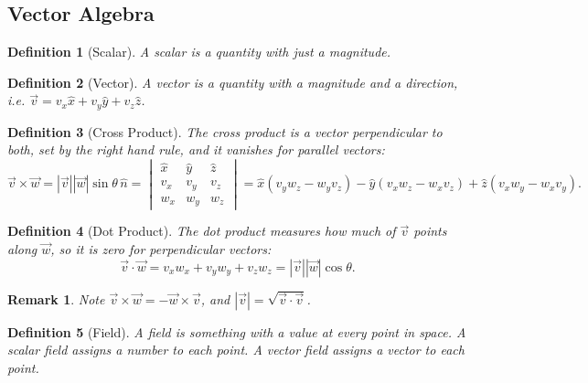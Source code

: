 \documentclass{article}
\newtheorem{definition}{Definition}
\newtheorem{remark}{Remark}
\begin{document}
\subsection{Vector Algebra}
\begin{definition}[Scalar]
    A scalar is a quantity with just a magnitude.
\end{definition}
\begin{definition}[Vector]
    A vector is a quantity with a magnitude and a direction, i.e. $\vec{v} = v_x\hat{x} + v_y\hat{y} + v_z\hat{z}$.
\end{definition}
\begin{definition}[Cross Product]
    The cross product is a vector perpendicular to both, set by the right hand rule, and it vanishes for parallel vectors:
    \begin{equation}
        \vec{v}\times\vec{w} = |\vec{v}||\vec{w}|\sin\theta\,\hat{n}
        = \begin{vmatrix} \hat{x} & \hat{y} & \hat{z} \\ v_x & v_y & v_z \\ w_x & w_y & w_z \end{vmatrix}
        = \hat{x}(v_yw_z - w_yv_z) - \hat{y}(v_xw_z - w_xv_z) + \hat{z}(v_xw_y - w_xv_y).
    \end{equation}
\end{definition}
\begin{definition}[Dot Product]
    The dot product measures how much of $\vec{v}$ points along $\vec{w}$, so it is zero for perpendicular vectors:
    \begin{equation}
        \vec{v}\cdot\vec{w} = v_xw_x + v_yw_y + v_zw_z = |\vec{v}||\vec{w}|\cos\theta.
    \end{equation}
\end{definition}
\begin{remark}
    Note $\vec{v}\times\vec{w} = -\vec{w}\times\vec{v}$, and $|\vec{v}| = \sqrt{\vec{v}\cdot\vec{v}}$.
\end{remark}
\begin{definition}[Field]
    A field is something with a value at every point in space. A scalar field assigns a number to each point. A vector field assigns a vector to each point.
\end{definition}
\end{document}
